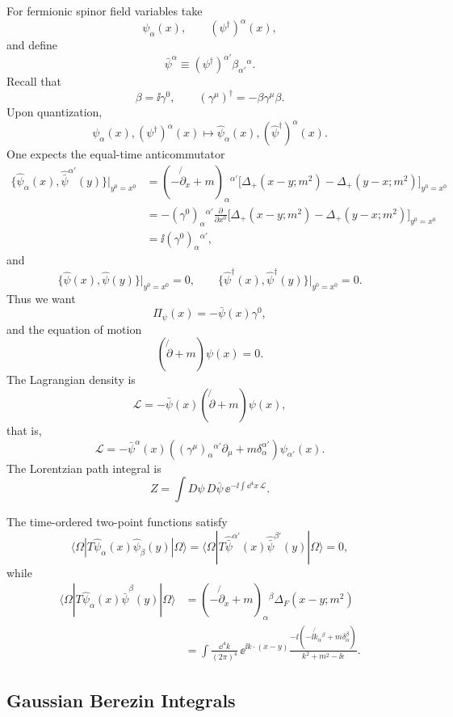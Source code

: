 For fermionic spinor field variables take
\[
  \psi_\alpha(x),
  \qquad
  (\psi^\dagger)^\alpha(x),
\]
and define
\[
  \bar\psi^\alpha
  \equiv
  (\psi^\dagger)^{\alpha'}\beta_{\alpha'}{}^\alpha.
\]
Recall that
\[
  \beta=\ii\gamma^0,
  \qquad
  (\gamma^\mu)^\dagger=-\beta\gamma^\mu\beta.
\]
Upon quantization,
\[
  \psi_\alpha(x),(\psi^\dagger)^\alpha(x)
  \mapsto
  \widehat\psi_\alpha(x),(\widehat\psi^\dagger)^\alpha(x).
\]
One expects the equal-time anticommutator
\[
\begin{aligned}
  \{\widehat\psi_\alpha(x),\widehat{\bar\psi}^{\alpha'}(y)\}
  \big|_{y^0=x^0}
  &=
  \left(-\not{\partial}_x+m\right)_\alpha{}^{\alpha'}
  \bigl[
    \Delta_+(x-y;m^2)-\Delta_+(y-x;m^2)
  \bigr]_{y^0=x^0}
  \\
  &=
  -(\gamma^0)_\alpha{}^{\alpha'}
  \frac{\partial}{\partial x^0}
  \bigl[
    \Delta_+(x-y;m^2)-\Delta_+(y-x;m^2)
  \bigr]_{y^0=x^0}
  \\
  &=
  \ii(\gamma^0)_\alpha{}^{\alpha'},
\end{aligned}
\]
and
\[
  \{\widehat\psi(x),\widehat\psi(y)\}\big|_{y^0=x^0}=0,
  \qquad
  \{\widehat\psi^\dagger(x),\widehat\psi^\dagger(y)\}
  \big|_{y^0=x^0}=0.
\]
Thus we want
\[
  \Pi_\psi(x)=-\bar\psi(x)\gamma^0,
\]
and the equation of motion
\[
  (\not{\partial}+m)\psi(x)=0.
\]
The Lagrangian density is
\[
  \mathcal L
  =
  -\bar\psi(x)(\not{\partial}+m)\psi(x),
\]
that is,
\[
  \mathcal L
  =
  -\bar\psi^\alpha(x)
  \left(
    (\gamma^\mu)_\alpha{}^{\alpha'}\partial_\mu
    +m\delta_\alpha^{\alpha'}
  \right)
  \psi_{\alpha'}(x).
\]
The Lorentzian path integral is
\[
  Z
  =
  \int D\psi\,D\bar\psi\,
  \ee^{-\ii\int\dd^4x\,\mathcal L}.
\]

The time-ordered two-point functions satisfy
\[
  \langle\Omega|T\widehat\psi_\alpha(x)\widehat\psi_\beta(y)|\Omega\rangle
  =
  \langle\Omega|T\widehat{\bar\psi}^{\alpha'}(x)
  \widehat{\bar\psi}^{\beta'}(y)|\Omega\rangle
  =
  0,
\]
while
\[
\begin{aligned}
  \langle\Omega|
  T\widehat\psi_\alpha(x)\widehat{\bar\psi}^{\beta}(y)
  |\Omega\rangle
  &=
  (-\not{\partial}_x+m)_\alpha{}^\beta
  \Delta_F(x-y;m^2)
  \\
  &=
  \int\frac{\dd^4k}{(2\pi)^4}\,
  \ee^{\ii k\cdot(x-y)}
  \frac{
    -\ii\left(-\ii\not{k}_\alpha{}^\beta
    +m\delta_\alpha^\beta\right)
  }{k^2+m^2-\ii\epsilon}.
\end{aligned}
\]

\subsection{Gaussian Berezin Integrals}

